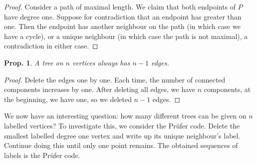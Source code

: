 \documentclass[12pt, a4paper]{book}
\newtheorem{proposition}[theorem]{Prop.}
\theoremstyle{nonumberplain}
\newtheorem{proof}{Proof}
\begin{document}
\begin{proof}
    Consider a path of maximal length.
    We claim that both endpoints of $P$ have degree one.
    Suppose for contradiction that an endpoint has greater than one.
    Then the endpoint has another neighbour on the path (in which case we have a cycle), or a unique neighbour (in which case the path is not maximal), a contradiction in either case.
\end{proof}
\begin{proposition}
    A tree on $n$ vertices always has $n-1$ edges.
\end{proposition}
\begin{proof}
    Delete the edges one by one.
    Each time, the number of connected components increases by one.
    After deleting all edges, we have $n$ components, at the beginning, we have one, so we deleted $n-1$ edges.
\end{proof}
We now have an interesting question: how many different trees can be given on $n$ labelled vertices?
To investigate this, we consider the Pr{\"u}fer code. Delete the smallest labelled degree one vertex and write up its unique neighbour's label.
Continue doing this until only one point remains.
The obtained sequences of labels is the Pr\"ufer code.
\end{document}
